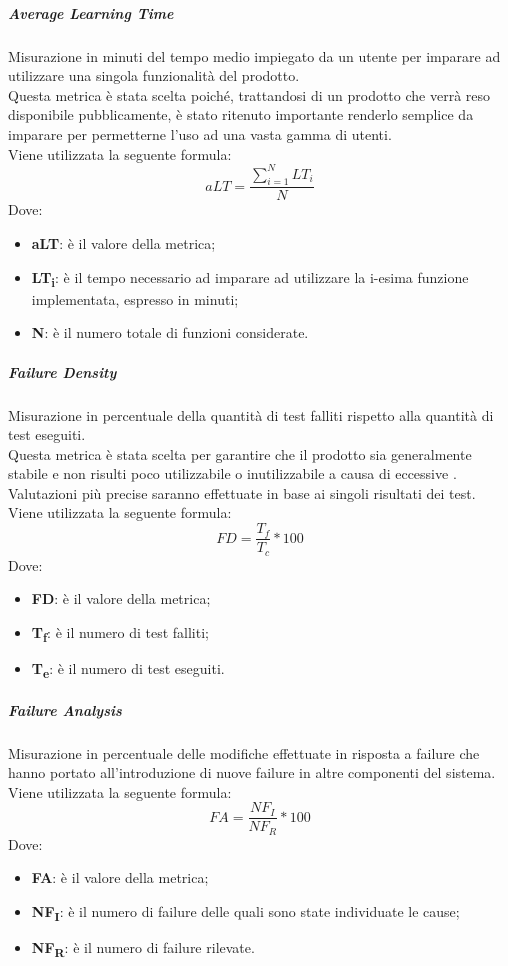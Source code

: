 \subparagraph{Average Learning Time}\Spazio
Misurazione in minuti del tempo medio impiegato da un utente per imparare ad utilizzare una singola funzionalità del prodotto.
\\Questa metrica è stata scelta poiché, trattandosi di un prodotto che verrà reso disponibile pubblicamente, è stato ritenuto importante renderlo semplice da imparare per permetterne l'uso ad una vasta gamma di utenti.
\\Viene utilizzata la seguente formula:
$$aLT=\frac{\sum\limits_{i=1}^N{LT_i}}{N}$$
Dove:
\begin{itemize}
	\item{\textbf{aLT}: è il valore della metrica;}
	\item{\textbf{LT\textsubscript{i}}: è il tempo necessario ad imparare ad utilizzare la i-esima funzione implementata, espresso in minuti;}
	\item{\textbf{N}: è il numero totale di funzioni considerate.}
\end{itemize}

\subparagraph{Failure Density}\Spazio
Misurazione in percentuale della quantità di test falliti rispetto alla quantità di test eseguiti.
\\Questa metrica è stata scelta per garantire che il prodotto sia generalmente stabile e non risulti poco utilizzabile o inutilizzabile a causa di eccessive . Valutazioni più precise saranno effettuate in base ai singoli risultati dei test.\\
Viene utilizzata la seguente formula:
$$FD=\frac{T_f}{T_c}*100$$
Dove:
\begin{itemize}
	\item{\textbf{FD}: è il valore della metrica;}
	\item{\textbf{T\textsubscript{f}}: è il numero di test falliti;}
	\item{\textbf{T\textsubscript{e}}: è il numero di test eseguiti.}
\end{itemize}

\subparagraph{Failure Analysis}\Spazio
Misurazione in percentuale delle modifiche effettuate in risposta a failure che hanno portato all'introduzione di nuove failure in altre componenti del sistema. \\
Viene utilizzata la seguente formula:
$$FA=\frac{NF_I}{NF_R}*100$$
Dove:
\begin{itemize}
	\item{\textbf{FA}: è il valore della metrica;}
	\item{\textbf{NF\textsubscript{I}}: è il numero di failure delle quali sono state individuate le cause;}
	\item{\textbf{NF\textsubscript{R}}: è il numero di failure rilevate.}
\end{itemize}

